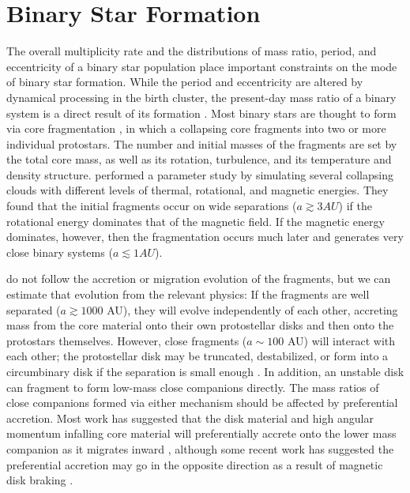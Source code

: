 \documentclass{utthesis}
\begin{document}
\section{Binary Star Formation}

The overall multiplicity rate and the distributions of mass ratio, period, and eccentricity of a binary star population place important constraints on the mode of binary star formation. While the period and eccentricity are altered by dynamical processing in the birth cluster, the present-day mass ratio of a binary system is a direct result of its formation \citep{Parker2013}. Most binary stars are thought to form via core fragmentation \citep{Boss1979, Boss1986, Bate1995}, in which a collapsing core fragments into two or more individual protostars. The number and initial masses of the fragments are set by the total core mass, as well as its rotation, turbulence, and its temperature and density structure. \citet{Machida2008} performed a parameter study by simulating several collapsing clouds with different levels of thermal, rotational, and magnetic energies. They found that the initial fragments occur on wide separations ($a \gtrsim 3 AU$) if the rotational energy dominates that of the magnetic field. If the magnetic energy dominates, however, then the fragmentation occurs much later and generates very close binary systems ($a \lesssim 1 AU$). 

\citet{Machida2008} do not follow the accretion or migration evolution of the fragments, but we can estimate that evolution from the relevant physics: If the fragments are well separated ($a \gtrsim 1000$ AU), they will evolve independently of each other, accreting mass from the core material onto their own protostellar disks and then onto the protostars themselves.  However, close fragments ($a \sim 100$ AU) will interact with each other; the protostellar disk may be truncated, destabilized, or form into a circumbinary disk if the separation is small enough \citep{Bate1997}. In addition, an unstable disk can fragment to form low-mass close companions \citep{Kratter2006, Stamatellos2011} directly. The mass ratios of close companions formed via either mechanism should be affected by preferential accretion. Most work has suggested that the disk material and high angular momentum infalling core material will preferentially accrete onto the lower mass companion as it migrates inward \citep{Bate1997, BBB2002}, although some recent work has suggested the preferential accretion may go in the opposite direction as a result of magnetic disk braking \citep{Zhao2013}.
\end{document}
